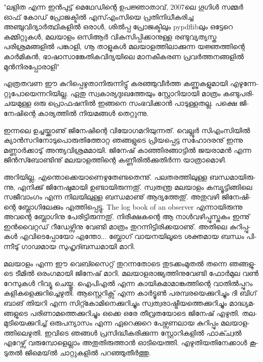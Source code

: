 {\vskip 2pt}

‌{\large "ലളിത എന്ന ഇന്‍പുട്ട് മെഥേഡിന്റെ ഉപജ്ഞാതാവ്, 2007ലെ ഗൂഗിള്‍ സമ്മര്‍ ഓഫ് കോഡ് പ്രോജക്ടില്‍ എസ്എംസിയെ 
പ്രതിനിധീകരിച്ച അഞ്ചുവിദ്യാര്‍ത്ഥികളില്‍ ഒരാള്‍, ശില്‍പ്പ പ്രോജക്ടിലും pypdflibലും ഒട്ടേറെ കമ്മിറ്റുകള്‍, മലയാളം ഒസിആര്‍ 
വികസിപ്പിക്കാനുള്ള രണ്ടുവ്യത്യസ്ത പരിശ്രമങ്ങളില്‍ പങ്കാളി, ഗ്നൂ താളുകള്‍ മലയാളത്തിലാക്കുന്ന യജ്ഞത്തിന്റെ കാര്‍മികന്‍, 
ഭാഷാസാങ്കേതികവിദ്യയിലെ മാനകീകരണ പ്രവര്‍ത്തനങ്ങളില്‍ മുന്‍നിരപ്പോരാളി"}

{\vskip 12pt}

എ­ത്ര­ത­വണ ഈ കു­റി­പ്പെ­ഴു­താ­നി­രു­ന്നി­ട്ടു് കര­ഞ്ഞു­വീര്‍­ത്ത കണ്ണു­ക­ളു­മാ­യി എഴു­ന്നേ­റ്റു­പോ­യെ­ന്ന­റി­യി­ല്ല. ഏതു സ്വ­കാ­ര്യ­ദുഃ­ഖ­ത്തേ­യും 
സ്റ്റോ­റി­യാ­യി മാ­ത്രം കണ്ടു­പ­രി­ച­യ­മു­ള്ള ഒരു പ്രൊ­ഫ­ഷ­നില്‍ ഇങ്ങ­നെ സം­ഭ­വി­ക്കാന്‍ പാ­ടു­ള്ള­ത­ല്ല. പക്ഷെ ജി­നേ­ഷി­ന്റെ 
കാ­ര്യ­ത്തില്‍ നി­യ­മ­ങ്ങള്‍ തെ­റ്റു­ന്നു.

ഇ­ന്ന­ലെ ഉച്ച­യ്ക്കാ­ണു് ജി­നേ­ഷി­ന്റെ വി­യോ­ഗ­മ­റി­യു­ന്ന­ത്. വെ­ല്ലൂര്‍ സി­എം­സി­യില്‍ ക്യാന്‍­സ­റി­നോ­ടു­പൊ­രു­തി­ത്തോ­റ്റ ഞങ്ങ­ളു­ടെ 
പ്രി­യ­പ്പെ­ട്ട സഹോ­ദ­ര­നു് ഇന്നു മണ്ണാര്‍­ക്കാ­ടു് അന്ത്യ­വി­ശ്ര­മ­മാ­യി. ജി­നേ­ഷ് കാ­ഞ്ഞി­ര­ങ്ങാ­ട്ടില്‍ ജയ­രാ­മന്‍ എന്ന ജിന്‍സ്ബോണ്ടിനു്
മല­യാ­ള­ത്തി­ന്റെ കണ്ണീ­രില്‍­ക്കു­തിര്‍­ന്ന യാ­ത്രാ­മൊ­ഴി­.

അ­റി­യി­ല്ല, എന്തൊ­ക്കെ­യാ­ണെ­ഴു­തേ­ണ്ട­തെ­ന്നു്. പല­ത­ര­ത്തി­ലു­ള്ള ബന്ധ­മാ­യി­രു­ന്നു, എനി­ക്കു് ജി­നേ­ഷു­മാ­യി ഉണ്ടാ­യി­രു­ന്ന­തു്. 
സ്വ­ത­ന്ത്ര ­മ­ല­യാ­ളം­ കമ്പ്യൂ­ട്ടി­ങ്ങി­ലെ സജീ­വാം­ഗം എന്ന നി­ല­യി­ലു­ള്ള ബന്ധ­മാ­ണു് ആദ്യ­ത്തേ­തു്. അതു­വ­ഴി ജി­നേ­ഷി­ന്റെ 
ബ്ലോ­ഗി­ലേ­ക്കും എത്തി­പ്പെ­ട്ടു. The log book of an observer എന്നാ­യി­രു­ന്നു അവ­ന്റെ ബ്ലോ­ഗി­നു പേ­രി­ട്ടി­രു­ന്ന­തു്. നി­രീ­ക്ഷ­ക­ന്റെ 
ആ നാള്‍­വ­ഴി­പ്പു­സ്ത­കം ഇന്നു് ഇന്‍­വൈ­റ്റ­ഡ് റീ­ഡേ­ഴ്സി­നു വേ­ണ്ടി മാ­ത്രം തു­റ­ന്നി­ട്ടി­രി­ക്ക­യാ­ണു്. അതി­ലെ കു­റി­പ്പു­കള്‍ 
എവി­ടെ­പ്പോ­യോ എന്തോ­... ബ്ലോ­ഗ് വാ­യ­ന­യി­ലൂ­ടെ ശക്ത­മായ ബന്ധം പി­ന്നീ­ടു് ഗാ­ഢ­മായ സു­ഹൃ­ദ്ബ­ന്ധ­മാ­യി മാ­റി­.

മലയാളം എന്ന ഈ വെ­ബ്സൈ­റ്റ് തു­റ­ന്ന­തോ­ടെ തു­ട­ക്കം­മു­തല്‍ തന്നെ ഞങ്ങ­ളു­ടെ ടീ­മില്‍ ഒരം­ഗ­മാ­യി ജി­നേ­ഷ് മാ­റി. 
മലയാളരാജ്യത്തിനുവേണ്ടി ഫോര്‍­മുല വണ്‍ റേ­സു­കള്‍ റി­വ്യൂ ചെ­യ്തു. ഐപി­എല്‍ എന്ന കാ­യി­ക­മാ­മാ­ങ്ക­ത്തി­ന്റെ വാ­തില്‍­പ്പു­റം 
കളി­ക­ളെ­ക്കു­റി­ച്ചെ­ഴു­തി. ആസ്റ്റെ­റി­ക്സ് എന്ന കാര്‍­ട്ടൂണ്‍ പര­മ്പ­ര­യെ­ക്കു­റി­ച്ചും ദി ബി­ഗ് ബാ­ങ് തി­യ­റി എന്ന സി­റ്റ്കോ­മി­നെ­ക്കു­റി­ച്ചും 
സ്വ­ത്വ­രാ­ഷ്ട്രീ­യ­ത്തെ­ക്കു­റി­ച്ചും മാ­ദ്ധ്യ­മ­ങ്ങ­ളു­ടെ പരി­ണാ­മ­ത്തെ­ക്കു­റി­ച്ചും ഒക്കെ ഒരേ തീ­വ്ര­ത­യോ­ടെ ജി­നേ­ഷ് എഴു­തി. തല­മു­ടി­യെ­ക്കു­റി­ച്ച് 
ഒരു­പ­ന്യാ­സം എന്ന ഏറെ­ക്കു­റെ പേ­ഴ്സ­ണ­ലായ കു­റി­പ്പും മല­യാ­ള­ത്തി­ലെ­ഴു­തി. ഇവി­ടെ ഞങ്ങള്‍ പ്ര­സി­ദ്ധീ­ക­രി­ക്കു­ന്ന സ്റ്റോ­റി­ക­ളില്‍ 
ഫാ­ക്ച്വല്‍ എറേ­ഴ്സ് വരു­മ്പോ­ളെ­ല്ലാം അതു­തി­രു­ത്താന്‍ ഓടി­യെ­ത്തി. എഴു­തി­യ­തി­നേ­ക്കാള്‍ കൂ­ടു­തല്‍ ജി­മെ­യ്ല്‍ ചാ­റ്റു­ക­ളില്‍ 
പറ­ഞ്ഞു­തീര്‍­ത്തു­.

